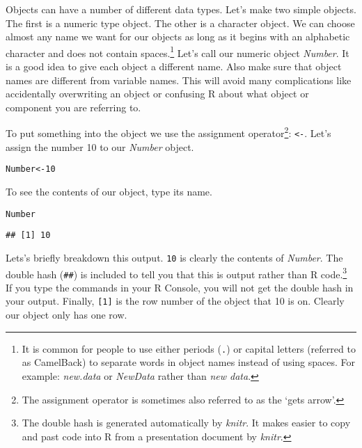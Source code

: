 Objects can have a number of different data types. Let's make two simple objects. The first is a numeric type object. The other is a character object. We can choose almost any name we want for our objects as long as it begins with an alphabetic character and does not contain spaces.\footnote{It is common for people to use either periods (\texttt{.}) or capital letters (referred to as CamelBack) to separate words in object names instead of using spaces. For example: {\emph{new.data}} or {\emph{NewData}} rather than {\emph{new data}}.} Let's call our numeric object {\emph{Number}}. It is a good idea to give each object a different name. Also make sure that object names are different from variable names. This will avoid many complications like accidentally overwriting an object or confusing R about what object or component you are referring to.

To put something into the object we use the assignment operator\footnote{The assignment operator is sometimes also referred to as the `gets arrow'.}: {\tt{\textless -}}. Let's assign the number 10 to our {\emph{Number}} object.

\begin{knitrout}
\color{fgcolor}\begin{kframe}
\begin{alltt}
Number <- 10
\end{alltt}
\end{kframe}
\end{knitrout}


\noindent To see the contents of our object, type its name.

\begin{knitrout}
\color{fgcolor}\begin{kframe}
\begin{alltt}
Number
\end{alltt}
\begin{verbatim}
## [1] 10
\end{verbatim}
\end{kframe}
\end{knitrout}


\noindent Lets's briefly breakdown this output. \texttt{10} is clearly the contents of {\emph{Number}}. The double hash (\texttt{\#\#}) is included to tell you that this is output rather than R code.\footnote{The double hash is generated automatically by {\emph{knitr}}. It makes easier to copy and past code into R from a presentation document by {\emph{knitr}}.} If you type the commands in your R Console, you will not get the double hash in your output. Finally, \texttt{[1]} is the row number of the object that 10 is on. Clearly our object only has one row.   

